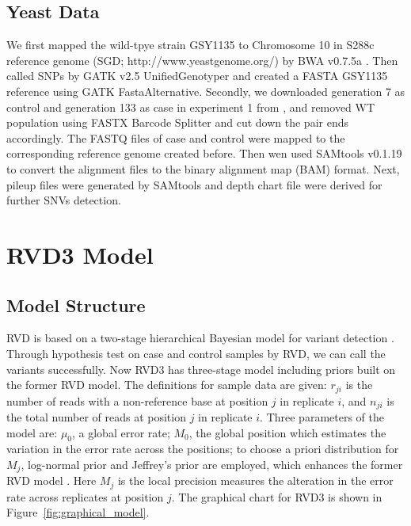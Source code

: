 \documentclass[11pt,reqno]{amsart}
\begin{document}
\subsection{Yeast Data}
We first mapped the wild-tpye strain GSY1135 \citep{kvitek2011reciprocal} to Chromosome 10 in S288c reference genome (SGD; http://www.yeastgenome.org/) by BWA v0.7.5a \citep{li2009fast}.
Then called SNPs by GATK v2.5 UnifiedGenotyper \citep{McKenna:2010bva, depristo2011framework} and created a FASTA GSY1135 reference using GATK FastaAlternative.
Secondly, we downloaded generation 7 as control and generation 133 as case in experiment 1 from \citep{kvitek2013whole}, and removed WT population using FASTX Barcode Splitter and cut down the pair ends accordingly.
The FASTQ files of case and control were mapped to the corresponding reference genome created before.
Then wen used SAMtools v0.1.19 \citep{li2009sequence} to convert the alignment files to the binary alignment map (BAM) format.
Next, pileup files were generated by SAMtools and depth chart file were derived for further SNVs detection.

\section{RVD3 Model}

\subsection{Model Structure}\label{sec:model_structure}
RVD is based on a two-stage hierarchical Bayesian model for variant detection \citep{Flaherty:2011ja}. Through hypothesis test on case and control samples by RVD, we can call the variants successfully.
Now RVD3 has three-stage model including priors built on the former RVD model.
The definitions for sample data are given: $r_{ji}$ is the number of reads with a non-reference base at position $j$ in replicate $i$, and $n_{ji}$ is the total number of reads at position $j$ in replicate $i$.
Three parameters of the model are: $\mu_0$, a global error rate; $M_0$, the global position which estimates the variation in the error rate across the positions;
to choose a priori distribution for $M_j$, log-normal prior and Jeffrey's prior \citep{jeffreys1946invariant} are employed, which enhances the former RVD model \citep{Flaherty:2011ja}.
Here $M_j$ is the local precision measures the alteration in the error rate across replicates at position $j$. The graphical chart for RVD3 is shown in Figure~\ref{fig:graphical_model}.
\end{document}
